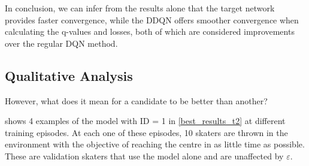 In conclusion, we can infer from the results alone that the target network provides faster convergence, while the DDQN offers smoother convergence when calculating the q-values and losses, both of which are considered improvements over the regular DQN method.

\subsection{Qualitative Analysis}

However, what does it mean for a candidate to be better than another?

 shows 4 examples of the model with ID = 1 in \cref{best_results_t2} at different training episodes.
At each one of these episodes, 10 skaters are thrown in the environment with the objective of reaching the centre in as little time as possible.
These are validation skaters that use the model alone and are unaffected by $\varepsilon$.

